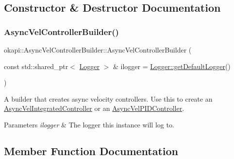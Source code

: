 \subsection{Constructor \& Destructor Documentation}
\mbox{\label{classokapi_1_1AsyncVelControllerBuilder_a2240959e5feeb59b630fe93e6e993996}} 
\subsubsection{\texorpdfstring{AsyncVelControllerBuilder()}{AsyncVelControllerBuilder()}}
{\footnotesize\ttfamily okapi\+::\+Async\+Vel\+Controller\+Builder\+::\+Async\+Vel\+Controller\+Builder (\begin{DoxyParamCaption}\item[{const std\+::shared\+\_\+ptr$<$ \mbox{\hyperlink{classokapi_1_1Logger}{Logger}} $>$ \&}]{ilogger = {\ttfamily \mbox{\hyperlink{classokapi_1_1Logger_a5053cf778b4b55acba788a3797dc96d2}{Logger\+::get\+Default\+Logger}}()} }\end{DoxyParamCaption})\hspace{0.3cm}{\ttfamily [explicit]}}

A builder that creates async velocity controllers. Use this to create an \mbox{\hyperlink{classokapi_1_1AsyncVelIntegratedController}{Async\+Vel\+Integrated\+Controller}} or an \mbox{\hyperlink{classokapi_1_1AsyncVelPIDController}{Async\+Vel\+P\+I\+D\+Controller}}.


\begin{DoxyParams}{Parameters}
{\em ilogger} & The logger this instance will log to. \\
\hline
\end{DoxyParams}


\subsection{Member Function Documentation}
\mbox{\label{classokapi_1_1AsyncVelControllerBuilder_a23ecaa0969360f45c4f0266ff81fdb6d}} 
